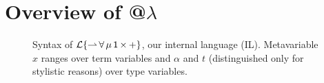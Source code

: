 \documentclass[pldi]{sigplanconf-pldi15}
\begin{document}

\section{Overview of @$\lambda$}\label{atlam}\label{overview}
\begin{figure}[t]
\small
\hspace{-5px}
\caption{Syntax of {$\mathcal{L}\{{\rightharpoonup}\,{\forall}\,{\mu}\,{{\sf 1}}\,{\times}\,{+}\}$}, our internal language (IL). Metavariable $x$ ranges over term variables and $\alpha$ and $t$ (distinguished only for stylistic reasons) over type variables.}
\label{syntax-IL}
\vspace{-10px}
\end{figure}
\end{document}
